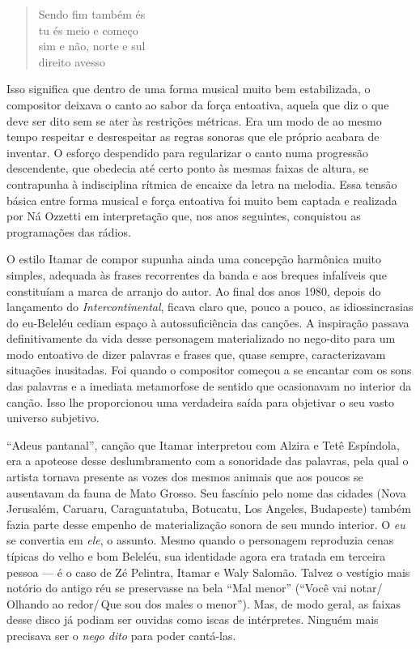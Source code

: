 \begin{verse}
\small{Sendo fim também és\\
tu és meio e começo\\
sim e não, norte e sul\\
direito avesso}
\end{verse}

Isso significa que dentro de uma forma musical muito bem estabilizada, o
compositor deixava o canto ao sabor da força entoativa, aquela que diz o
que deve ser dito sem se ater às restrições métricas. Era um modo de ao
mesmo tempo respeitar e desrespeitar as regras sonoras que ele próprio
acabara de inventar. O esforço despendido para regularizar o canto numa
progressão descendente, que obedecia até certo ponto às mesmas faixas de
altura, se contrapunha à indisciplina rítmica de encaixe da letra na
melodia. Essa tensão básica entre forma musical e força entoativa foi
muito bem captada e realizada por Ná Ozzetti em interpretação que, nos
anos seguintes, conquistou as programações das rádios.

O estilo Itamar de compor supunha ainda uma concepção harmônica muito
simples, adequada às frases recorrentes da banda e aos breques
infalíveis que constituíam a marca de arranjo do autor. Ao final dos
anos 1980, depois do lançamento do \textit{Intercontinental}, ficava claro que,
pouco a pouco, as idiossincrasias do eu-Beleléu cediam espaço à
autossuficiência das canções. A inspiração passava definitivamente da
vida desse personagem materializado no nego-dito para um modo entoativo
de dizer palavras e frases que, quase sempre, caracterizavam situações
inusitadas. Foi quando o compositor começou a se encantar com os sons
das palavras e a imediata metamorfose de sentido que ocasionavam no
interior da canção. Isso lhe proporcionou uma verdadeira saída para
objetivar o seu vasto universo subjetivo.

``Adeus pantanal'', canção que Itamar interpretou com Alzira e Tetê
Espíndola, era a apoteose desse deslumbramento com a sonoridade das
palavras, pela qual o artista tornava presente as vozes dos mesmos
animais que aos poucos se ausentavam da fauna de Mato Grosso. Seu
fascínio pelo nome das cidades (Nova Jerusalém, Caruaru, Caraguatatuba,
Botucatu, Los Angeles, Budapeste) também fazia parte desse empenho de
materialização sonora de seu mundo interior. O \textit{eu} se convertia em
\textit{ele}, o assunto. Mesmo quando o personagem reproduzia cenas típicas
do velho e bom Beleléu, sua identidade agora era tratada em terceira
pessoa --- é o caso de Zé Pelintra, Itamar e Waly Salomão. Talvez o
vestígio mais notório do antigo réu se preservasse na bela ``Mal menor''
(``Você vai notar/\,Olhando ao redor/\,Que sou dos males o menor'').
Mas, de modo geral, as faixas desse disco já podiam ser ouvidas como
iscas de intérpretes. Ninguém mais precisava ser o \textit{nego dito} para poder
cantá-las.

